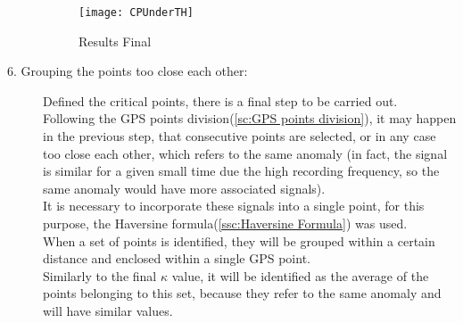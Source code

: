 \documentclass[tesi]{subfiles}
\begin{document}
\begin{description}
\begin{figure}[H]
\texttt{[image: CPUnderTH]}
\caption{Results Final}
\end{figure}\label{fig:Critical Points Final Result}
\item[6. Grouping the points too close each other:]  Defined the critical points, there is a final step to be carried out.\\Following the GPS points division(\ref{sc:GPS points division}), it may happen in the previous step, that consecutive points are selected, or in any case too close each other, which refers to the same anomaly (in fact, the signal is similar for a given small time due the high recording frequency, so the same anomaly would have more associated signals).\\It is necessary to incorporate these signals into a single point, for this purpose, the Haversine formula(\ref{ssc:Haversine Formula}) was used.\\When a set of points is identified, they will be grouped within a certain distance and enclosed within a single GPS point.\\Similarly to the final $\kappa$ value, it will be identified as the average of the points belonging to this set, because they refer to the same anomaly and will have similar values.
\end{description}
\end{document}
